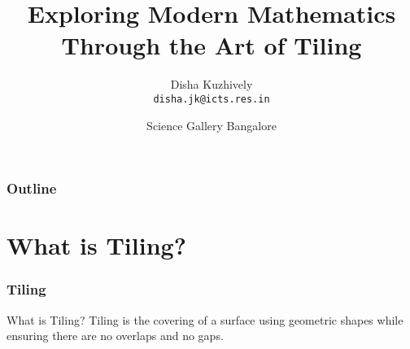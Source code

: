 \documentclass{beamer}
\title{Exploring Modern Mathematics Through the Art of Tiling}
\author[dishajk]{Disha Kuzhively\\ \texttt{disha.jk@icts.res.in}}
\institute{International Centre for Theoretical Sciences - TIFR, Bangalore}
\date[Sci560]{Science Gallery Bangalore}
\begin{document}
\begin{frame}
    \titlepage
\end{frame}
\begin{frame}
    \frametitle{Outline}
    \tableofcontents[pausesections]
\end{frame}
\section{What is Tiling?}
\begin{frame}
    \frametitle{Tiling}
    \begin{block}{What is Tiling?}    
    Tiling is the covering of a surface using geometric shapes while ensuring there are \alert{no overlaps} and \alert{no gaps}.
    \end{block}
    \pause
{}
\end{frame}
\end{document}

